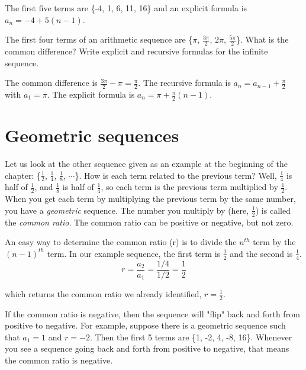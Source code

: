 \begin{Answer}[ref=seq2]
The first five terms are \{-4, 1, 6, 11, 16\} and an explicit formula 
is $a_n = -4 + 5(n-1)$. 
\end{Answer}

\begin{Exercise}[label=seq3]
The first four terms of an arithmetic sequence are \{$\pi$, 
$\frac{3\pi}{2}$, $2\pi$, $\frac{5\pi}{2}$\}. What is the common 
difference? Write explicit and recursive formulas for the infinite 
sequence.
\end{Exercise}

\begin{Answer}[ref=seq3]
The common difference is $\frac{3\pi}{2} - \pi = \frac{\pi}{2}$. The 
recursive formula is $a_n = a_{n-1} + \frac{\pi}{2}$ with $a_1 = \pi$. 
The explicit formula is $a_n = \pi + \frac{\pi}{2}(n-1)$. 
\end{Answer}

\section{Geometric sequences}
Let us look at the other sequence given as an example at the beginning 
of the chapter: \{$\frac{1}{2}$, $\frac{1}{4}$, $\frac{1}{8}$, 
$\cdots$\}. How is each term related to the previous term? Well, 
$\frac{1}{4}$ is half of $\frac{1}{2}$, and $\frac{1}{8}$ is half of 
$\frac{1}{4}$, so each term is the previous term multiplied by 
$\frac{1}{2}$. When you get each term by multiplying the previous term by the same
number, you have a \textit{geometric} sequence.
The number you multiply by (here, $\frac{1}{2}$) is called the
\textit{common ratio}. The common ratio can be positive 
or negative, but not zero. 

An easy way to determine the common ratio (r) is to divide the 
$n^{th}$ term by the $(n-1)^{th}$ term. In our example sequence, 
the first term is $\frac{1}{2}$ and the second is $\frac{1}{4}$. 
$$r = \frac{a_2}{a_1} = \frac{1/4}{1/2} = \frac{1}{2}$$

which returns the common ratio we already identified, $r= \frac{1}{2}$. 

If the common ratio is negative, then the sequence will "flip" back 
and forth from positive to negative. For example, suppose there is a 
geometric sequence such that $a_1 = 1$ and $r = -2$. Then the first 5 
terms are \{1, -2, 4, -8, 16\}. Whenever you see a sequence going 
back and forth from positive to negative, that means the common ratio 
is negative. 

